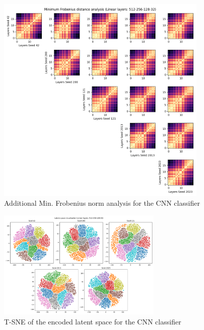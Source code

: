 \documentclass[../main.tex]{subfiles}
\begin{document}
%
\begin{figure}[ht!]
    \centering
    \includegraphics[width=0.9\textwidth]{figures/rs/sim_cls/frob_512-256-128-32__42_200_121_2013_2023.png}
    \caption{Additional Min. Frobenius norm analysis for the CNN classifier}
    \label{fig:extra_frob_cls}
\end{figure}
%
\begin{figure}[ht!]
    \centering
    \includegraphics[width=0.7\textwidth]{figures/rs/sim_cls/vis_tsne_512-256-128-32__42_200_121_2013_2023.png} 
    \caption{T-SNE of the encoded latent space  for the CNN classifier}
    \label{fig:tsne_cls}
\end{figure}
%
\end{document}

